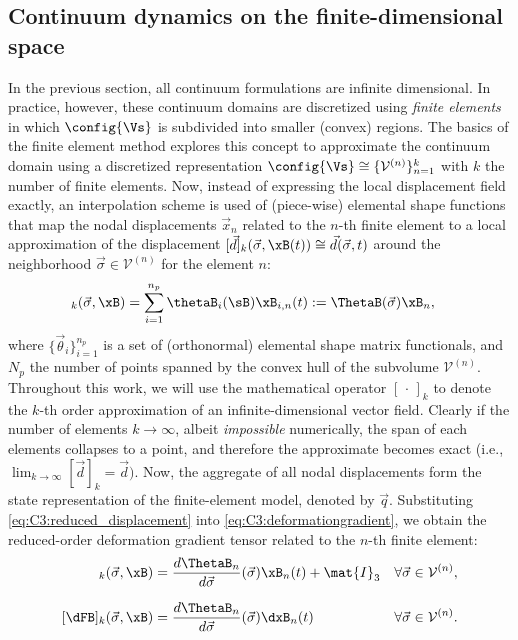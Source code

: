 \subsection{Continuum dynamics on the finite-dimensional space}
In the previous section, all continuum formulations are infinite dimensional. In practice, however, these continuum domains are discretized using \textit{finite elements} in which $\config{\Vs}$ is subdivided into smaller (convex) regions. The basics of the finite element method explores this concept to approximate the continuum domain using a discretized representation $\config{\Vs} \cong \{{\mathcal{V}}^{(n)} \}^{k}_{n=1}$ with $k$ the number of finite elements. Now, instead of expressing the local displacement field exactly, an interpolation scheme is used of (piece-wise) elemental shape functions that map the nodal displacements $\vec{x}_n$ related to the $n$-th finite element to a local approximation of the displacement $
[\vec{d}]_k(\vec{\sigma},\xB(t))\cong \vec{d}(\vec{\sigma},t)$ around the neighborhood $\vec{\sigma} \in \mathcal{V}^{(n)}$ for the element $n$:
%
\begin{align}
[\vec{d}]_{k}(\vec{\sigma},\xB) & = \sum_{i=1}^{n_p}\thetaB_i(\sB) \xB_{i,n}(t) := \ThetaB(\vec{\sigma}) \xB_n,
\label{eq:C3:reduced_displacement}
\end{align}
%
where $\{\vec{\theta}_i\}_{i=1}^{n_p}$ is a set of (orthonormal) elemental shape matrix functionals, and $N_p$ the number of points spanned by the convex hull of the subvolume $\mathcal{V}^{(n)}$. Throughout this work, we will use the mathematical operator $[\,\cdot\,]_k$ to denote the $k$-th order approximation of an infinite-dimensional vector field. Clearly if the number of elements $k \to \infty$, albeit \textit{impossible} numerically, the span of each elements collapses to a point, and therefore the approximate becomes exact (i.e., $\lim_{k \to {\infty}}[\vec{d}]_k =  \vec{d})
$. Now, the aggregate of all nodal displacements form the state representation of the finite-element model, denoted by $\vec{q}$. Substituting \eqref{eq:C3:reduced_displacement} into \eqref{eq:C3:deformationgradient}, we obtain the reduced-order deformation gradient tensor related to the $n$-th finite element:
%
\begin{align}
[\mat{F}]_k(\vec{\sigma},\xB) & = \frac{d \ThetaB_n } {d \vec{\sigma}}(\vec{\sigma}) \xB_n(t) + \mat{I}_3 &  \forall \vec{\sigma} \in \mathcal{V}^{(n)},
\label{eq:C3:reduced_gradient}                                        \\[0.75em]
%
[\dFB]_k(\vec{\sigma},\xB) & = \frac{d \ThetaB_n } {d \vec{\sigma}}(\vec{\sigma}) \dxB_n(t) & \forall \vec{\sigma} \in \mathcal{V}^{(n)}.
\label{eq:C3:reduced_gradient_diff}
\end{align}
